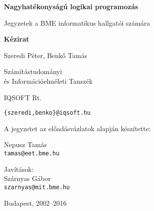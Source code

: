 \vspace*{3cm}
\thispagestyle{empty}

\centerline{\Huge\bf Nagyhatékonyságú logikai programozás}

\vspace{0.5cm}

\centerline{\Large  Jegyzetek a BME informatikus hallgatói számára}
\vspace{1cm}

\centerline{\large\bf Kézirat}
\vspace{3cm}


\begin{center}
{\Large Szeredi Péter, Benk{\H o} Tamás
	\vspace{0.3cm}
	
	Számítástudományi\\
	és Információelméleti Tanszék
	\vspace{0.3cm}
	
	IQSOFT Rt.}
\vspace{0.3cm}

{\large\tt \{szeredi,benko\}@iqsoft.hu}

\vspace{2cm}

{\large A jegyzetet az előadásvázlatok alapján készítette:\\
	
	\vspace{0.3cm}
	
	\Large Nepusz Tamás \\
	\vspace{0.3cm}
	{\large\tt tamas@eet.bme.hu}
}

{\large Javítások:\\

	\Large Szárnyas Gábor \\
	\vspace{0.3cm}
	{\large\tt szarnyas@mit.bme.hu}
}
	
\end{center}

\vspace{3cm}

\centerline{\large Budapest, 2002--2016}

\clearpage
